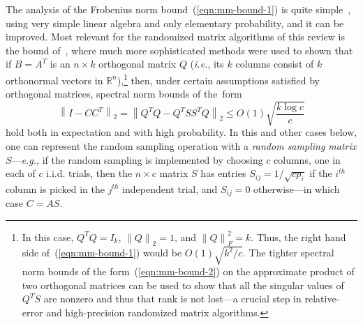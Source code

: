 \documentclass[twoside]{article}
\newcommand{\TNorm }[1]{\mbox{}\left\|#1\right\|_2  }
\newcommand{\FNormS}[1]{\mbox{}\left\|#1\right\|_F^2}
\begin{document}
The analysis of the Frobenius norm bound~(\ref{eqn:mm-bound-1}) is quite 
simple~\cite{dkm_matrix1}, using very simple linear algebra and only 
elementary probability, and it can be improved.
Most relevant for the randomized matrix algorithms of this review is the 
bound of~\cite{Rud99,RV07}, where much more sophisticated methods were used 
to shown that if $B=A^T$ is an $n \times k$ orthogonal matrix $Q$ 
(\emph{i.e.}, its $k$ columns consist of $k$ orthonormal vectors in 
$\mathbb{R}^{n}$),\footnote{In this case, $Q^TQ=I_k$, $\TNorm{Q}=1$, and $\FNormS{Q}=k$.  
Thus, the right hand side of~(\ref{eqn:mm-bound-1}) would be 
$O(1)\sqrt{k^2/c}$.
The tighter spectral norm bounds of the form~(\ref{eqn:mm-bound-2}) on the 
approximate product of two orthogonal matrices can be used to show that all 
the singular values of $Q^TS$ are nonzero and thus that rank 
is not lost---a crucial step in relative-error and high-precision 
randomized matrix algorithms.}
then, under certain assumptions satisfied by orthogonal matrices, spectral 
norm bounds of the~form 
\begin{equation}
\TNorm{I - CC^T} 
   = \TNorm{Q^TQ - Q^TSS^TQ} 
   \leq O(1)\sqrt{\frac{k \log c}{c}} 
\label{eqn:mm-bound-2}
\end{equation}
hold both in expectation and with high probability.
In this and other cases below, one can represent the random sampling operation 
with a \emph{random sampling matrix} $S$---\emph{e.g.}, if the random 
sampling is implemented by choosing $c$ columns, one in each of $c$ i.i.d. trials, then the $n \times c$ matrix 
$S$ has entries $S_{ij}=1/\sqrt{cp_i}$ if the $i^{th}$
column is picked in the $j^{th}$ independent trial, and $S_{ij}=0$ 
otherwise---in which case $C=AS$.
\end{document}
